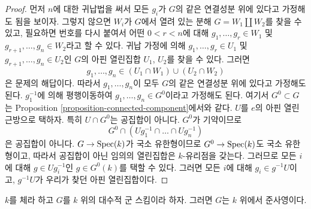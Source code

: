 \begin{proof}
먼저 $n$에 대한 귀납법을 써서 모든 $g_i$가 $G$의 같은 연결성분 위에 있다고 가정해도 됨을 보이자.
그렇지 않으면 $W_i$가 $G$에서 열려 있는 분해 $G = W_1 \amalg W_2$를 찾을 수 있고, 필요하면
번호를 다시 붙여서 어떤 $0 < r < n$에 대해 $g_1, \ldots, g_r \in W_1$ 및
$g_{r + 1}, \ldots, g_n \in W_2$라고 할 수 있다. 귀납 가정에 의해
$g_1, \ldots, g_r \in U_1$ 및 $g_{r + 1}, \ldots, g_n \in U_2$인 $G$의 아핀 열린집합 $U_1$, $U_2$를 찾을 수 있다.
그러면
$$
g_1, \ldots, g_n \in (U_1 \cap W_1) \cup (U_2 \cap W_2)
$$
은 문제의 해답이다. 따라서 $g_1, \ldots, g_n$이 모두 $G$의 같은 연결성분 위에 있다고 가정해도 된다.
$g_1^{-1}$에 의해 평행이동하여 $g_1, \ldots, g_n \in G^0$이라고 가정해도 된다. 여기서
$G^0 \subset G$는 Proposition \ref{proposition-connected-component}에서와 같다. $U$를 $e$의 아핀 열린 근방으로 택하자.
특히 $U \cap G^0$는 공집합이 아니다. $G^0$가 기약이므로
$$
G^0 \cap (Ug_1^{-1} \cap \ldots \cap Ug_n^{-1})
$$
은 공집합이 아니다. $G \to \mathop{\mathrm{Spec}}(k)$가 국소 유한형이므로 $G^0 \to \mathop{\mathrm{Spec}}(k)$도 국소 유한형이고,
따라서 공집합이 아닌 임의의 열린집합은 $k$-유리점을 갖는다. 그러므로 모든 $i$에 대해
$g \in Ug_i^{-1}$인 $g \in G^0(k)$를 택할 수 있다. 그러면 모든 $i$에 대해 $g_i \in g^{-1}U$이고,
$g^{-1}U$가 우리가 찾던 아핀 열린집합이다.
\end{proof}

\begin{lemma}
\label{lemma-algebraic-quasi-projective}
$k$를 체라 하고 $G$를 $k$ 위의 대수적 군 스킴이라 하자. 그러면 $G$는 $k$ 위에서 준사영이다.
\end{lemma}

